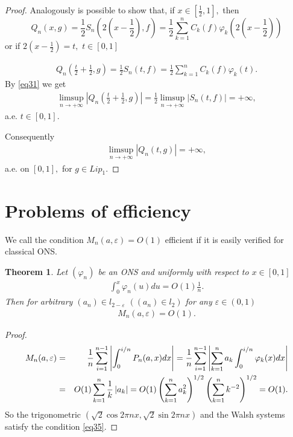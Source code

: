\documentclass{publmathdeb}
\newtheorem{theorem}{Theorem}[section]
\begin{document}
\begin{proof}
		Analogously is possible to show that, if $x\in \left[\frac{1}{2}, 1 \right],$ then 
		$$ Q_n \left(x, g\right)=\frac{1}{2} S_n \left(2 \left(x-\frac{1}{2}\right),f\right)=\frac{1}{2} \sum_{k=1}^{n} C_k(f) \varphi_{k}\left(2 \left(x-\frac{1}{2}\right)\right) $$
		or if $2 \left(x-\frac{1}{2}\right)=t,$ $t\in [0,1]$
		
		\begin{eqnarray*}
			Q_n \left(\frac{t}{2} + \frac{1}{2}, g\right) =  \frac{1}{2} S_n(t,f)=\frac{1}{2} \sum_{k=1}^{n} C_k(f) \varphi_{k}(t). 
		\end{eqnarray*}
		By \eqref{eq31} we get
		\begin{eqnarray*}
			\limsup_{n \rightarrow +\infty} \left|	Q_n \left(\frac{t}{2} + \frac{1}{2}, g\right)\right| = \frac{1}{2} \limsup_{n \rightarrow +\infty} \left| S_n(t,f) \right|= + \infty,
		\end{eqnarray*}
		a.e. $t \in \left[0, 1 \right]. $
		
		Consequently
		\begin{eqnarray*}
			\limsup_{n \rightarrow +\infty} \left|Q_n(t,g)\right| = + \infty, 
		\end{eqnarray*}
		a.e. on $[0,1],$ for $g \in Lip_1.$
	\end{proof}
	\section{Problems of efficiency }
	We call the condition $M_n(a,\varepsilon) = O(1)$ efficient if it is easily verified for classical ONS.
	
	\begin{theorem}
		\label{theorem7} Let $(\varphi_{n})$  be an ONS and  uniformly with respect to $x \in [0,1]$
		\begin{eqnarray*}
			\int_{0}^{x} \varphi_{n}(u) du = O(1) \frac{1}{n}. 
		\end{eqnarray*}
		Then for arbitrary $(a_n) \in l_{2-\varepsilon}$ $((a_n) \in l_2)$ for any $\varepsilon \in (0,1)$
		\begin{eqnarray}
			\label{eq35}
			M_n (a,\varepsilon)=O(1).
		\end{eqnarray}
		
	\end{theorem}
	
	\begin{proof}
		
		\begin{eqnarray}\label{eq36}
			M_n (a,\varepsilon)&=&\frac{1}{n} \sum_{i=1}^{n-1} \left| \int_{0}^{i/n} P_n(a,x) dx \right|  = \frac{1}{n} \sum_{i=1}^{n-1} \left|\sum_{k=1}^{n} a_k \int_{0}^{i/n} \varphi_{k}(x)dx \right|   \\
			&=& O(1) \sum_{k=1}^{n} \frac{1}{k} \left|a_k\right| = O(1)  \left(\sum_{k=1}^{n} a_k^2\right)^{1/2} \left(\sum_{k=1}^{n} k^{-2}\right)^{1/2} = O(1). \notag
		\end{eqnarray}
		So the trigonometric $(\sqrt{2} \cos 2 \pi nx, \sqrt{2} \sin 2 \pi nx)$ and the Walsh systems satisfy the condition \eqref{eq35}.
	\end{proof}
	
\end{document}
